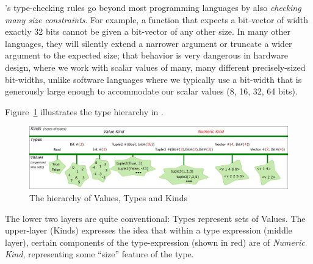 {\BSV}'s type-checking rules go beyond most programming languages by also
\emph{checking many size constraints}.  For example, a {\BSV} function
that expects a bit-vector of width exactly 32 bits cannot be given a
bit-vector of any other size.  In many other languages, they will
silently extend a narrower argument or truncate a wider argument to
the expected size; that behavior is very dangerous in hardware design,
where we work with scalar values of many, many different
precisely-sized bit-widths, unlike software languages where we
typically use a bit-width that is generously large enough to
accommodate our scalar values (8, 16, 32, 64 bits).

Figure~\ref{Fig_BSV_Types} illustrates the type hierarchy in {\BSV}.
\begin{figure}[htbp]
  \centerline{\includegraphics[width=\textwidth,angle=0]{Figures/Fig_BSV_Types}}
  \caption{\label{Fig_BSV_Types}The hierarchy of Values, Types and Kinds}
\end{figure}
The lower two layers are quite conventional: Types represent sets of
Values.  The upper-layer (Kinds) expresses the idea that within a type
expression (middle layer), certain components of the type-expression
(shown in red) are of \emph{Numeric Kind}, representing some ``size''
feature of the type.

\vspace{1ex}

